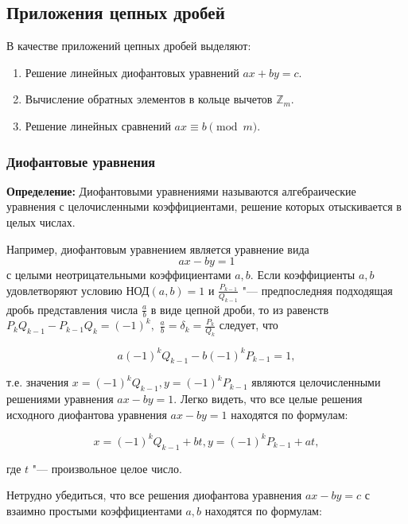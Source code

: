 \documentclass[bachelor, och, labwork]{shiza}
\begin{document}
    \subsection{Приложения цепных дробей}
    
        В качестве приложений цепных дробей выделяют:

        \begin{enumerate}
            \item Решение линейных диофантовых уравнений $ax + by = c$.
            \item Вычисление обратных элементов в кольце вычетов $\mathbb{Z}_m$.
            \item Решение линейных сравнений $ax \equiv b \pmod m$.
        \end{enumerate}

        \subsubsection{Диофантовые уравнения}

            \textbf{Определение:} Диофантовыми уравнениями называются алгебраические
            уравнения с целочисленными коэффициентами, решение которых отыскивается
            в целых числах.

            Например, диофантовым уравнением является уравнение вида $$ax - by = 1$$
            с целыми неотрицательными коэффициентами $a, b$. Если коэффициенты $a,
            b$ удовлетворяют условию НОД$(a, b) = 1$ и $\frac{P_{k-1}}{Q_{k-1}}$
            "--- предпоследняя подходящая дробь представления числа $\frac{a}{b}$ в
            виде цепной дроби, то из равенств $P_{k}Q_{k-1} - P_{k-1}Q_{k} =
            (-1)^k,$ $\frac{a}{b} = \delta_k = \frac{P_k}{Q_k}$ следует, что

            $$a (-1)^k Q_{k-1} - b (-1)^k P_{k-1} = 1,$$

            т.е. значения $x = (-1)^k Q_{k-1}, y = (-1)^k P_{k-1}$ являются
            целочисленными решениями уравнения $ax - by = 1$. Легко видеть, что все
            целые решения исходного диофантова уравнения $ax - by = 1$ находятся по
            формулам:
            
            $$x = (-1)^k Q_{k-1} + bt, y = (-1)^k P_{k-1} + at,$$

            где $t$ "--- произвольное целое число.

            Нетрудно убедиться, что все решения диофантова уравнения $ax - by = c$ с
            взаимно простыми коэффициентами $a, b$ находятся по формулам:
\end{document}
